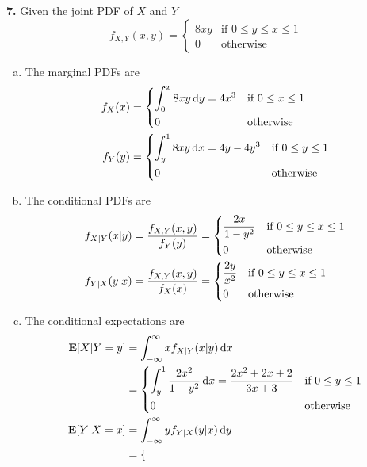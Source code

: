 \documentclass[a4paper,12pt]{article}
\newcommand{\E}{\mathbf E}
\newcommand{\ud}{\,\mathrm{d}}
\newcommand{\exercise}[1]{\noindent\textbf{#1.}}
\begin{document}
\exercise 7  Given the joint PDF of $X$ and $Y$
\[f_{X,Y}(x, y) = \begin{cases}
  8xy &\text{if }0 \le y \le x \le 1\\
  0 &\text{otherwise}
\end{cases}\]
\begin{enumerate}[(a)]
  \item The marginal PDFs are
    \begin{align*}
      f_X(x) &= \begin{dcases}
        \int_0^x 8xy\ud y = 4x^3 &\text{if }0 \le x \le 1\\
        0 &\text{otherwise}
      \end{dcases}\\
      f_Y(y) &= \begin{dcases}
        \int_y^1 8xy\ud x = 4y - 4y^3 &\text{if }0 \le y \le 1\\
        0 &\text{otherwise}
      \end{dcases}
    \end{align*}
  \item The conditional PDFs are
    \begin{align*}
      f_{X|Y}(x|y) = \frac{f_{X,Y}(x, y)}{f_Y(y)} &= \begin{dcases}
        \frac{2x}{1 - y^2} &\text{if }0 \le y \le x \le 1\\
        0 &\text{otherwise}
      \end{dcases}\\
      f_{Y|X}(y|x) = \frac{f_{X,Y}(x, y)}{f_X(x)} &= \begin{dcases}
        \frac{2y}{x^2} &\text{if }0 \le y \le x \le 1\\
        0 &\text{otherwise}
      \end{dcases}
    \end{align*}
  \item The conditional expectations are
    \begin{align*}
      \E[X|Y=y] &= \int_{-\infty}^\infty xf_{X|Y}(x|y)\ud x\\
      &= \begin{dcases}
        \int_y^1\frac{2x^2}{1-y^2}\ud x = \frac{2x^2 + 2x + 2}{3x + 3}
        &\text{if }0 \le y \le 1\\
        0 &\text{otherwise}
      \end{dcases}\\
      \E[Y|X=x] &= \int_{-\infty}^\infty yf_{Y|X}(y|x)\ud y\\
      &= \begin{dcases}

\end{dcases}
\end{align*}
\end{enumerate}
\end{document}
